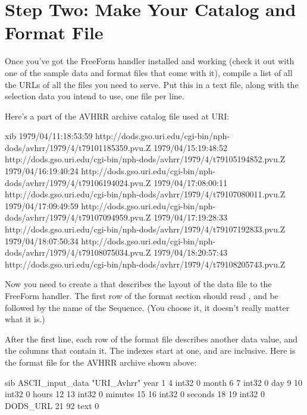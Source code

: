 \section{Step Two: Make Your Catalog and Format File}

Once you've got the FreeForm handler installed and working (check it
out with one of the sample data and format files that come with it),
compile a list of all the URLs of all the files you need to serve.
Put this in a text file, along with the selection data you intend to
use, one file per line.

Here's a part of the AVHRR archive catalog file used at URI:

\begin{vcode}{xib}
1979/04/11:18:53:59  http://dods.gso.uri.edu/cgi-bin/nph-dods/avhrr/1979/4/t79101185359.pvu.Z
1979/04/15:19:48:52  http://dods.gso.uri.edu/cgi-bin/nph-dods/avhrr/1979/4/t79105194852.pvu.Z
1979/04/16:19:40:24  http://dods.gso.uri.edu/cgi-bin/nph-dods/avhrr/1979/4/t79106194024.pvu.Z
1979/04/17:08:00:11  http://dods.gso.uri.edu/cgi-bin/nph-dods/avhrr/1979/4/t79107080011.pvu.Z
1979/04/17:09:49:59  http://dods.gso.uri.edu/cgi-bin/nph-dods/avhrr/1979/4/t79107094959.pvu.Z
1979/04/17:19:28:33  http://dods.gso.uri.edu/cgi-bin/nph-dods/avhrr/1979/4/t79107192833.pvu.Z
1979/04/18:07:50:34  http://dods.gso.uri.edu/cgi-bin/nph-dods/avhrr/1979/4/t79108075034.pvu.Z
1979/04/18:20:57:43  http://dods.gso.uri.edu/cgi-bin/nph-dods/avhrr/1979/4/t79108205743.pvu.Z
\end{vcode}

Now you need to create a  that describes the layout
of the data file to the FreeForm handler.  The first row of the format
section should read , and be followed by the
name of the Sequence.  (You choose it, it doesn't really matter what
it is.)

After the first line, each row of the format file describes another
data value, and the columns that contain it.  The indexes start at
one, and are inclusive.  Here is the format file for the AVHRR archive
shown above:

\begin{vcode}{sib}
ASCII_input_data "URI_Avhrr"
year     1 4    int32 0
month    6 7    int32 0
day      9 10   int32 0
hours    12 13  int32 0
minutes  15 16  int32 0
seconds  18 19  int32 0
DODS_URL 21 92  text  0
\end{vcode}

